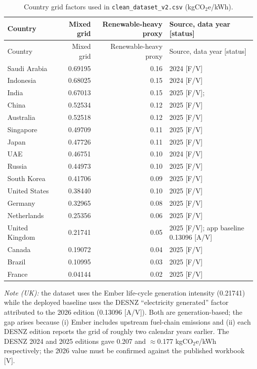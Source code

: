 \documentclass[11pt,a4paper]{article}
\begin{document}
\begin{longtable}{@{}lrrl@{}}
\caption{Country grid factors used in \texttt{clean\_dataset\_v2.csv}
(kgCO$_2$e/kWh).}\label{tab:grid}\\
\toprule
Country & Mixed grid & Renewable-heavy proxy & Source, data year [status] \\
\midrule
\endfirsthead
\toprule
Country & Mixed grid & Renewable-heavy proxy & Source, data year [status] \\
\midrule
\endhead
Saudi Arabia   & 0.69195 & 0.16 & \cite{ember_grid} 2024 [F/V] \\
Indonesia      & 0.68025 & 0.15 & \cite{ember_grid} 2024 [F/V] \\
India          & 0.67013 & 0.15 & \cite{ember_grid} 2025 [F/V]; \cite{cea_baseline} \\
China          & 0.52534 & 0.12 & \cite{ember_grid} 2025 [F/V] \\
Australia      & 0.52518 & 0.12 & \cite{ember_grid} 2025 [F/V] \\
Singapore      & 0.49709 & 0.11 & \cite{ember_grid} 2025 [F/V] \\
Japan          & 0.47726 & 0.11 & \cite{ember_grid} 2025 [F/V] \\
UAE            & 0.46751 & 0.10 & \cite{ember_grid} 2024 [F/V] \\
Russia         & 0.44973 & 0.10 & \cite{ember_grid} 2025 [F/V] \\
South Korea    & 0.41706 & 0.09 & \cite{ember_grid} 2025 [F/V] \\
United States  & 0.38440 & 0.10 & \cite{ember_grid} 2025 [F/V] \\
Germany        & 0.32965 & 0.08 & \cite{ember_grid} 2025 [F/V] \\
Netherlands    & 0.25356 & 0.06 & \cite{ember_grid} 2025 [F/V] \\
United Kingdom & 0.21741 & 0.05 & \cite{ember_grid} 2025 [F/V]; app baseline 0.13096 \cite{desnz2026} [A/V] \\
Canada         & 0.19072 & 0.04 & \cite{ember_grid} 2025 [F/V] \\
Brazil         & 0.10995 & 0.03 & \cite{ember_grid} 2025 [F/V] \\
France         & 0.04144 & 0.02 & \cite{ember_grid} 2025 [F/V] \\
\bottomrule
\end{longtable}

\noindent\textit{Note (UK):} the dataset uses the Ember life-cycle
generation intensity (0.21741) while the deployed baseline uses the DESNZ
``electricity generated'' factor attributed to the 2026 edition
(0.13096 \cite{desnz2026} [A/V]). Both are generation-based; the gap
arises because (i) Ember includes upstream fuel-chain emissions and
(ii) each DESNZ edition reports the grid of roughly two calendar years
earlier. The DESNZ 2024 and 2025 editions gave 0.207 and $\approx$0.177
kgCO$_2$e/kWh respectively; the 2026 value must be confirmed against the
published workbook [V].
\end{document}
